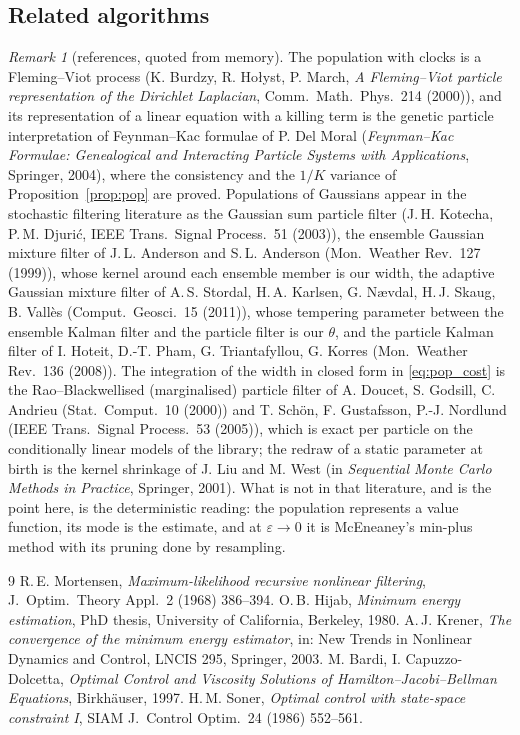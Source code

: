 \documentclass[11pt,a4paper]{article}
\newcommand{\eps}{\varepsilon}
\theoremstyle{plain}
\theoremstyle{definition}
\theoremstyle{remark}
\newtheorem{remark}{Remark}
\begin{document}
\subsection{Related algorithms}
\label{sec:pop_refs}

\begin{remark}[references, quoted from memory]
The population with clocks is a Fleming--Viot process (K. Burdzy, R. Ho\l yst, P. March, \emph{A Fleming--Viot particle representation of the Dirichlet Laplacian}, Comm.\ Math.\ Phys.\ 214 (2000)), and its representation of a linear equation with a killing term is the genetic particle interpretation of Feynman--Kac formulae of P. Del Moral (\emph{Feynman--Kac Formulae: Genealogical and Interacting Particle Systems with Applications}, Springer, 2004), where the consistency and the $1/K$ variance of Proposition~\ref{prop:pop} are proved. Populations of Gaussians appear in the stochastic filtering literature as the Gaussian sum particle filter (J.\,H. Kotecha, P.\,M. Djuri\'c, IEEE Trans.\ Signal Process.\ 51 (2003)), the ensemble Gaussian mixture filter of J.\,L. Anderson and S.\,L. Anderson (Mon.\ Weather Rev.\ 127 (1999)), whose kernel around each ensemble member is our width, the adaptive Gaussian mixture filter of A.\,S. Stordal, H.\,A. Karlsen, G. N\ae vdal, H.\,J. Skaug, B. Vall\`es (Comput.\ Geosci.\ 15 (2011)), whose tempering parameter between the ensemble Kalman filter and the particle filter is our $\theta$, and the particle Kalman filter of I. Hoteit, D.-T. Pham, G. Triantafyllou, G. Korres (Mon.\ Weather Rev.\ 136 (2008)). The integration of the width in closed form in \eqref{eq:pop_cost} is the Rao--Blackwellised (marginalised) particle filter of A. Doucet, S. Godsill, C. Andrieu (Stat.\ Comput.\ 10 (2000)) and T. Sch\"on, F. Gustafsson, P.-J. Nordlund (IEEE Trans.\ Signal Process.\ 53 (2005)), which is exact per particle on the conditionally linear models of the library; the redraw of a static parameter at birth is the kernel shrinkage of J. Liu and M. West (in \emph{Sequential Monte Carlo Methods in Practice}, Springer, 2001). What is not in that literature, and is the point here, is the deterministic reading: the population represents a value function, its mode is the estimate, and at $\eps\to0$ it is McEneaney's min-plus method with its pruning done by resampling.
\end{remark}

\begin{thebibliography}{9}\small
{} R.\,E. Mortensen, \emph{Maximum-likelihood recursive nonlinear filtering}, J.\ Optim.\ Theory Appl.\ 2 (1968) 386--394.
 O.\,B. Hijab, \emph{Minimum energy estimation}, PhD thesis, University of California, Berkeley, 1980.
 A.\,J. Krener, \emph{The convergence of the minimum energy estimator}, in: New Trends in Nonlinear Dynamics and Control, LNCIS 295, Springer, 2003.
 M. Bardi, I. Capuzzo-Dolcetta, \emph{Optimal Control and Viscosity Solutions of Hamilton--Jacobi--Bellman Equations}, Birkh\"auser, 1997.
 H.\,M. Soner, \emph{Optimal control with state-space constraint I}, SIAM J.\ Control Optim.\ 24 (1986) 552--561.
\end{thebibliography}
\end{document}
